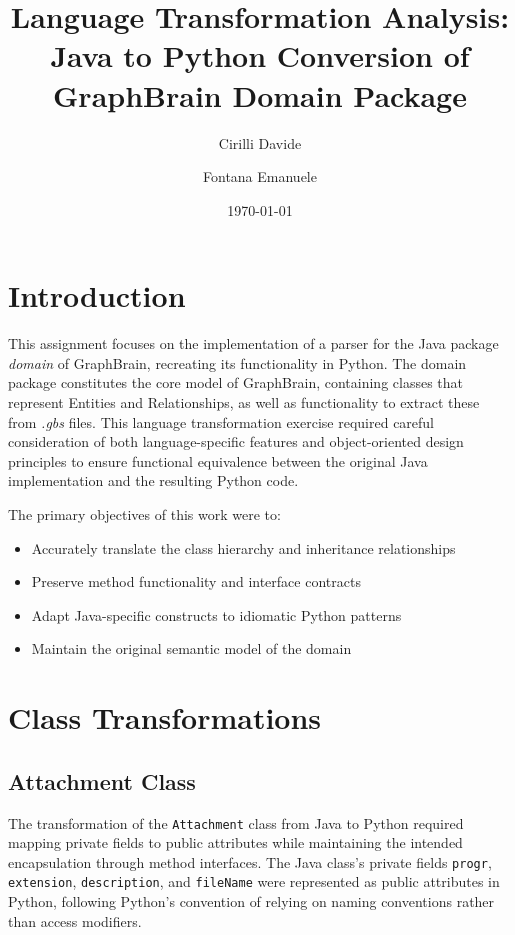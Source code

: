 \documentclass[12pt,a4paper]{article}
\title{Language Transformation Analysis: Java to Python Conversion of GraphBrain Domain Package}
\author[1]{Cirilli Davide}
\author[2]{Fontana Emanuele}
\affil[1,2]{Department of Computer Science, Università degli Studi di Bari}
\date{\today}
\begin{document}
\maketitle


\tableofcontents
\newpage

\section{Introduction}
This assignment focuses on the implementation of a parser for the Java package \textit{domain} of GraphBrain, recreating its functionality in Python. The domain package constitutes the core model of GraphBrain, containing classes that represent Entities and Relationships, as well as functionality to extract these from \textit{.gbs} files. This language transformation exercise required careful consideration of both language-specific features and object-oriented design principles to ensure functional equivalence between the original Java implementation and the resulting Python code.

The primary objectives of this work were to:
\begin{itemize}
    \item Accurately translate the class hierarchy and inheritance relationships
    \item Preserve method functionality and interface contracts
    \item Adapt Java-specific constructs to idiomatic Python patterns
    \item Maintain the original semantic model of the domain
\end{itemize}


\section{Class Transformations}

\subsection{Attachment Class}
The transformation of the \texttt{Attachment} class from Java to Python required mapping private fields to public attributes while maintaining the intended encapsulation through method interfaces. The Java class's private fields \texttt{progr}, \texttt{extension}, \texttt{description}, and \texttt{fileName} were represented as public attributes in Python, following Python's convention of relying on naming conventions rather than access modifiers.
\end{document}
